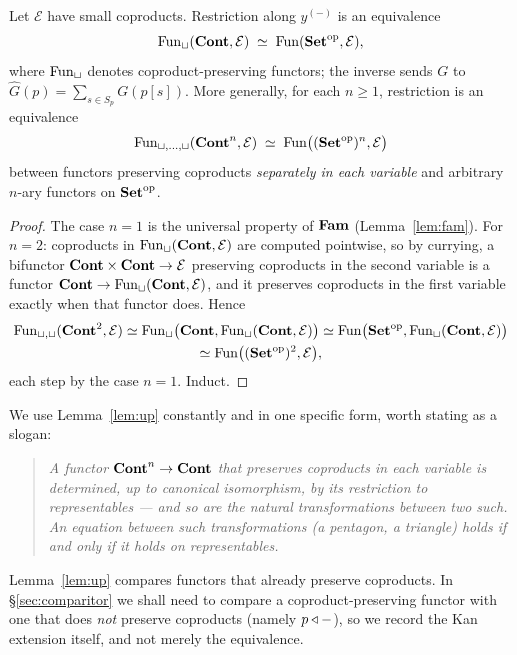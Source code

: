 \begin{Lemma}\label{lem:up}
Let $\mathcal E$ have small coproducts. Restriction along $y^{(-)}$ is an
equivalence
\[
  \operatorname{Fun}_{\sqcup}(\mathbf{Cont},\mathcal E)\;\simeq\;\operatorname{Fun}(\mathbf{Set}^{\mathrm{op}},\mathcal E),
\]
where $\operatorname{Fun}_\sqcup$ denotes coproduct-preserving functors; the inverse sends $G$
to $\widehat G(p)=\sum_{s\in S_p} G(p[s])$. More generally, for each $n\ge 1$,
restriction is an equivalence
\[
  \operatorname{Fun}_{\sqcup,\dots,\sqcup}(\mathbf{Cont}^n,\mathcal E)\;\simeq\;
  \operatorname{Fun}\bigl((\mathbf{Set}^{\mathrm{op}})^n,\mathcal E\bigr)
\]
between functors preserving coproducts \emph{separately in each variable} and
arbitrary $n$-ary functors on $\mathbf{Set}^{\mathrm{op}}$.
\end{Lemma}

\begin{proof}
The case $n=1$ is the universal property of $\mathbf{Fam}$ (Lemma~\ref{lem:fam}). For
$n=2$: coproducts in $\operatorname{Fun}_\sqcup(\mathbf{Cont},\mathcal E)$ are computed pointwise, so
by currying, a bifunctor $\mathbf{Cont}\times\mathbf{Cont}\to\mathcal E$ preserving coproducts in
the second variable is a functor $\mathbf{Cont}\to\operatorname{Fun}_\sqcup(\mathbf{Cont},\mathcal E)$, and it
preserves coproducts in the first variable exactly when that functor does. Hence
\begin{multline*}
\operatorname{Fun}_{\sqcup,\sqcup}(\mathbf{Cont}^2,\mathcal E)
 \simeq\operatorname{Fun}_\sqcup\bigl(\mathbf{Cont},\operatorname{Fun}_\sqcup(\mathbf{Cont},\mathcal E)\bigr)
 \simeq\operatorname{Fun}\bigl(\mathbf{Set}^{\mathrm{op}},\operatorname{Fun}_\sqcup(\mathbf{Cont},\mathcal E)\bigr)\\
 \simeq\operatorname{Fun}\bigl((\mathbf{Set}^{\mathrm{op}})^2,\mathcal E\bigr),
\end{multline*}
each step by the case $n=1$. Induct.
\end{proof}

We use Lemma~\ref{lem:up} constantly and in one specific form, worth stating as
a slogan:

\begin{quote}
\emph{A functor $\mathbf{Cont}^n\to\mathbf{Cont}$ that preserves coproducts in each variable is
determined, up to canonical isomorphism, by its restriction to representables ---
and so are the natural transformations between two such. An equation between
such transformations (a pentagon, a triangle) holds if and only if it holds on
representables.}
\end{quote}

Lemma~\ref{lem:up} compares functors that already preserve coproducts. In
§\ref{sec:comparitor} we shall need to compare a coproduct-preserving functor
with one that does \emph{not} preserve coproducts (namely $p\mathbin{\triangleleft}-$), so we
record the Kan extension itself, and not merely the equivalence.

